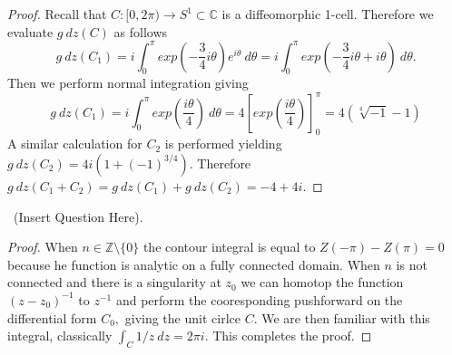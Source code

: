\documentclass[11pt]{amsart}
\theoremstyle{definition}
\numberwithin{theorem}{section}
\numberwithin{definition}{section}
\numberwithin{equation}{section}
\begin{document}
\begin{proof}	
	Recall that $C: [0, 2\pi) \to S^1 \subset \mathbb{C}$ is a diffeomorphic 1-cell. Therefore we evaluate $g\ dz(C)$ as follows
	\begin{equation*}
		g\ dz(C_1) =  i\int_0^{\pi}  exp\left(-\frac{3}{4} i\theta \right) e^{i\theta}\ d\theta =
		 i\int_0^{\pi}  exp\left(-\frac{3}{4} i\theta  + i\theta\right)\ d\theta.
	\end{equation*}
	Then we perform normal integration giving
	\begin{equation*}
		g\ dz(C_1) = i\int_0^{\pi} exp\left(\frac{i\theta}{4}\right)\ d\theta  = 4 \left[exp\left(\frac{i\theta}{4}\right)\right]_0^{\pi} = 4(\sqrt[4]{-1} - 1)
	\end{equation*}
	A similar calculation for $C_2$ is performed yielding $g\ dz(C_2) = 4i(1 + (-1)^{3/4}).$ Therefore $g\ dz(C_1 + C_2) = g\ dz(C_1) + g\ dz(C_2) = -4 + 4i$.
\end{proof}
\medskip {}\ (Insert Question Here).
\begin{proof}
 	When $n \in \mathbb{Z} \setminus \{0\}$ the contour integral is equal to $Z(-\pi) - Z(\pi) = 0$ because he function is analytic on a fully connected domain. When $n$ is not connected and there is a singularity at $z_0$ we can homotop the function $(z- z_0)^{-1}$ to $z^{-1}$ and perform the cooresponding pushforward on the differential form $C_0,$ giving the unit cirlce $C.$ We are then familiar with this integral, classically $\int_C 1/z\ dz = 2\pi i.$ This completes the proof.
 \end{proof} 
\end{document}
